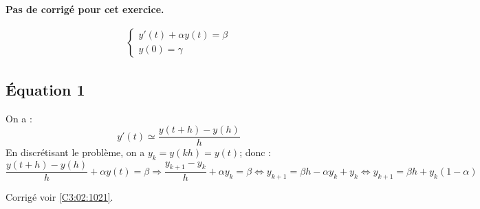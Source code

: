 \normaltrue \difficilefalse \tdifficilefalse
\correctionfalse


\setcounter{numques}{0}
\ifcorrection
\else
\textbf{Pas de corrigé pour cet exercice.}
\fi


\begin{eqnarray}
\left\{
\begin{array}{l}
y'(t) + \alpha y(t) = \beta \\
y(0) = \gamma
\end{array}
\right.
\end{eqnarray}


\ifprof

\subsection*{Équation 1}
On a :
$$
y'(t) \simeq \dfrac{y(t+h)-y(h)}{h}
$$
En discrétisant le problème, on a $y_k=y(kh)=y(t)$; donc : 
$$
\dfrac{y(t+h)-y(h)}{h} + \alpha y(t) = \beta \Longrightarrow 
\dfrac{y_{k+1}-y_k}{h} + \alpha y_k = \beta \Longleftrightarrow 
y_{k+1}  = \beta h - \alpha y_k + y_k \Longleftrightarrow 
y_{k+1}  = \beta h + y_k\left(1 - \alpha \right) 
$$
\else
\fi



 

\ifprof
\else
\begin{flushright}
\footnotesize{Corrigé  voir \ref{C3:02:1021}.}
\end{flushright}%
\fi